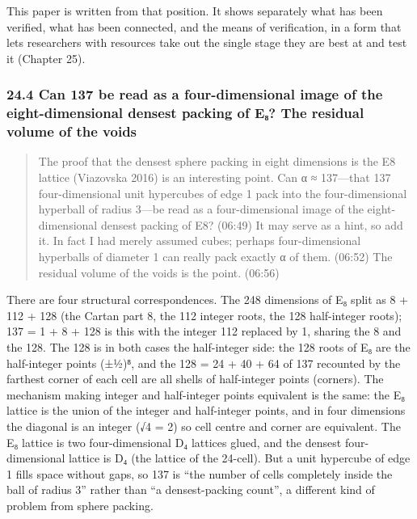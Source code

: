 \documentclass[
  a4paper,
]{article}
\begin{document}
This paper is written from that position. It shows separately what has
been verified, what has been connected, and the means of verification,
in a form that lets researchers with resources take out the single stage
they are best at and test it (Chapter 25).

\subsubsection{24.4 Can 137 be read as a four-dimensional image of the
eight-dimensional densest packing of E₈? The residual volume of the
voids}\label{can-137-be-read-as-a-four-dimensional-image-of-the-eight-dimensional-densest-packing-of-eux2088-the-residual-volume-of-the-voids}

\begin{quote}
The proof that the densest sphere packing in eight dimensions is the E8
lattice (Viazovska 2016) is an interesting point. Can α ≈ 137---that 137
four-dimensional unit hypercubes of edge 1 pack into the
four-dimensional hyperball of radius 3---be read as a four-dimensional
image of the eight-dimensional densest packing of E8? (06:49) It may
serve as a hint, so add it. In fact I had merely assumed cubes; perhaps
four-dimensional hyperballs of diameter 1 can really pack exactly α of
them. (06:52) The residual volume of the voids is the point. (06:56)
\end{quote}

There are four structural correspondences. The 248 dimensions of E₈
split as 8 + 112 + 128 (the Cartan part 8, the 112 integer roots, the
128 half-integer roots); 137 = 1 + 8 + 128 is this with the integer 112
replaced by 1, sharing the 8 and the 128. The 128 is in both cases the
half-integer side: the 128 roots of E₈ are the half-integer points
(±½)⁸, and the 128 = 24 + 40 + 64 of 137 recounted by the farthest
corner of each cell are all shells of half-integer points (corners). The
mechanism making integer and half-integer points equivalent is the same:
the E₈ lattice is the union of the integer and half-integer points, and
in four dimensions the diagonal is an integer (√4 = 2) so cell centre
and corner are equivalent. The E₈ lattice is two four-dimensional D₄
lattices glued, and the densest four-dimensional lattice is D₄ (the
lattice of the 24-cell). But a unit hypercube of edge 1 fills space
without gaps, so 137 is ``the number of cells completely inside the ball
of radius 3'' rather than ``a densest-packing count'', a different kind
of problem from sphere packing.
\end{document}
